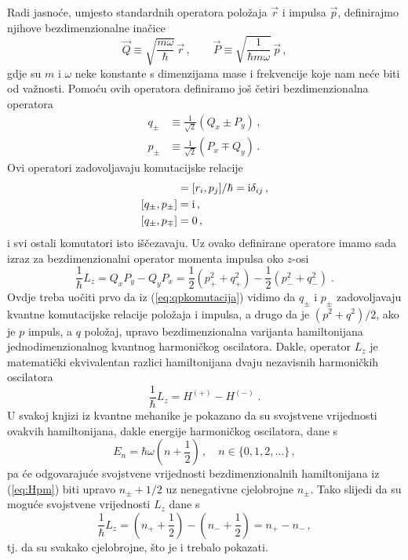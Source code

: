 Radi jasnoće, umjesto standardnih operatora položaja $\vec{r}$
i impulsa $\vec{p}$, definirajmo njihove bezdimenzionalne inačice
\begin{equation}
    \vec{Q} \equiv \sqrt{\frac{m \omega}{\hbar}} \,\vec{r} \,, \qquad
    \vec{P} \equiv \sqrt{\frac{1}{\hbar m \omega}} \, \vec{p} \,,
\end{equation}
gdje su $m$ i $\omega$ neke konstante s dimenzijama mase i frekvencije
koje nam neće biti od važnosti. Pomoću ovih operatora definiramo 
još četiri bezdimenzionalna operatora
\begin{align}
    q_{\pm}& \equiv \frac{1}{\sqrt{2}} (Q_x \pm P_y) \,, \\
    p_{\pm}& \equiv \frac{1}{\sqrt{2}} (P_x \mp Q_y) \,.
\end{align}
Ovi operatori zadovoljavaju komutacijske relacije
\begin{align}
    [Q_i, P_j]& =  [r_i, p_j] / \hbar = \rmi \delta_{ij} \,, \\
    [q_{\pm}, p_{\pm}]& = \rmi \,, \label{eq:qpkomutacija}\\
    [q_{\pm}, p_{\mp}]& = 0 \,,
\end{align}
i svi ostali komutatori isto iščezavaju. Uz ovako definirane
operatore imamo sada izraz za bezdimenzionalni operator momenta impulsa
oko $z$-osi
\begin{equation}
    \frac{1}{\hbar} L_z = Q_x P_y - Q_y P_x = \frac{1}{2}(p_{+}^2 + q_{+}^2)
                   - \frac{1}{2}(p_{-}^2 + q_{-}^2) \;.
\end{equation}
Ovdje treba uočiti prvo da iz (\ref{eq:qpkomutacija}) vidimo da
$q_{\pm}$ i $p_{\pm}$ zadovoljavaju kvantne komutacijske relacije položaja
i impulsa, a drugo da je $(p^2 + q^2)/2$, ako je $p$ impuls, a $q$ položaj,
upravo bezdimenzionalna varijanta hamiltonijana jednodimenzionalnog kvantnog
harmoničkog oscilatora. Dakle, operator $L_z$ je matematički ekvivalentan
razlici hamiltonijana dvaju nezavisnih harmoničkih oscilatora
\begin{equation}
\frac{1}{\hbar} L_z = H^{(+)} - H^{(-)} \;.
\label{eq:Hpm}
\end{equation}
U svakoj knjizi iz kvantne mehanike je pokazano
da su svojstvene vrijednosti ovakvih hamiltonijana, dakle energije harmoničkog
oscilatora, dane s 
\begin{equation}
    E_n = \hbar \omega \left(n + \frac{1}{2}\right)\,, 
    \quad n \in \{0, 1, 2, \ldots\} \,,
\end{equation}
pa će odgovarajuće svojstvene vrijednosti bezdimenzionalnih hamiltonijana
iz (\ref{eq:Hpm}) biti upravo $n_{\pm} + 1/2$ uz nenegativne
cjelobrojne $n_{\pm}$. Tako slijedi da su moguće svojstvene vrijednosti
$L_z$ dane s
\begin{equation}
    \frac{1}{\hbar} L_z = \left(n_{+} + \frac{1}{2}\right) -
    \left(n_{-} + \frac{1}{2}\right) = n_{+} - n_{-} \,,
\end{equation}
tj. da su svakako cjelobrojne, što je i trebalo pokazati.

